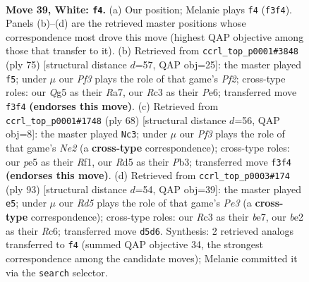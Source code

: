 \documentclass[11pt]{article}
\begin{document}
\clearpage

\begin{figure}[p]\centering
\begin{subfigure}{0.46\textwidth}\centering
\resizebox{\linewidth}{!}{%
\newchessgame
\chessboard[
  setfen={k3rn2/1p6/1r1p4/3Rp1Q1/4P3/1PR2P2/K3b1PP/8 w - - 2 39},
  showmover=false,
  pgfstyle=straightmove, color=movearrow, markmove={f3-f4}
]}
\caption{}
\end{subfigure}\hfill
\begin{subfigure}{0.46\textwidth}\centering
\resizebox{\linewidth}{!}{%
\newchessgame
\chessboard[
  setfen={1r6/r2k1p2/2p1p3/P5p1/1PRP3p/2R4P/5P2/5K2 b - - 2 38},
  showmover=false,
  pgfstyle=straightmove, color=movearrow, markmove={f7-f5}
]}
\caption{}
\end{subfigure}
\\[4pt]
\begin{subfigure}{0.46\textwidth}\centering
\resizebox{\linewidth}{!}{%
\newchessgame
\chessboard[
  setfen={2r5/p2r1p1p/2k1p3/R7/2P1n1P1/PP1p3P/1K2N3/5R2 w - - 0 35},
  showmover=false,
  pgfstyle=straightmove, color=movearrow, markmove={e2-c3}
]}
\caption{}
\end{subfigure}\hfill
\begin{subfigure}{0.46\textwidth}\centering
\resizebox{\linewidth}{!}{%
\newchessgame
\chessboard[
  setfen={8/1k2Bp2/p1r1p1p1/1pP5/3pr1P1/R6P/R6K/8 b - - 1 47},
  showmover=false,
  pgfstyle=straightmove, color=movearrow, markmove={e6-e5}
]}
\caption{}
\end{subfigure}
\caption{\textbf{Move 39, White: \texttt{f4}.} (a) Our position; Melanie plays \texttt{f4} (\texttt{f3f4}). Panels (b)--(d) are the retrieved master positions whose correspondence most drove this move (highest QAP objective among those that transfer to it). (b) Retrieved from \texttt{ccrl\_top\_p0001\#3848} (ply 75) [structural distance $d$=57, QAP obj=25]: the master played \texttt{f5}; under $\mu$ our \emph{Pf3} plays the role of that game's \emph{Pf2}; cross-type roles: our \emph{Q}g5 as their \emph{R}a7, our \emph{R}c3 as their \emph{P}e6; transferred move \texttt{f3f4} \textbf{(endorses this move)}. (c) Retrieved from \texttt{ccrl\_top\_p0001\#1748} (ply 68) [structural distance $d$=56, QAP obj=8]: the master played \texttt{Nc3}; under $\mu$ our \emph{Pf3} plays the role of that game's \emph{Ne2} (a \textbf{cross-type} correspondence); cross-type roles: our \emph{p}e5 as their \emph{R}f1, our \emph{R}d5 as their \emph{P}b3; transferred move \texttt{f3f4} \textbf{(endorses this move)}. (d) Retrieved from \texttt{ccrl\_top\_p0003\#174} (ply 93) [structural distance $d$=54, QAP obj=39]: the master played \texttt{e5}; under $\mu$ our \emph{Rd5} plays the role of that game's \emph{Pe3} (a \textbf{cross-type} correspondence); cross-type roles: our \emph{R}c3 as their \emph{b}e7, our \emph{b}e2 as their \emph{R}c6; transferred move \texttt{d5d6}. Synthesis: 2 retrieved analogs transferred to \texttt{f4} (summed QAP objective 34, the strongest correspondence among the candidate moves); Melanie committed it via the \texttt{search} selector.}
\label{fig:thought-m76}
\end{figure}
\end{document}
